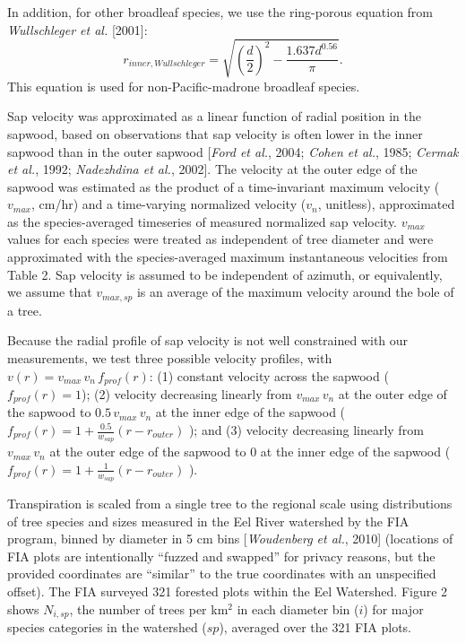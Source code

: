In addition, for other broadleaf species, we use the ring-porous equation from \textit{Wullschleger et al.} [2001]:
\begin{equation}
r_{inner,Wullschleger} = \sqrt{\left(\frac{d}{2}\right)^2-\frac{1.637d^{0.56}}{\pi}}.
\end{equation}
This equation is used for non-Pacific-madrone broadleaf species.

Sap velocity was approximated as a linear function of radial position in the sapwood, based on observations that sap velocity is often lower in the inner sapwood than in the outer sapwood [\textit{Ford et al.}, 2004; \textit{Cohen et al.}, 1985; \textit{Cermak et al.}, 1992; \textit{Nadezhdina et al.}, 2002].  The velocity at the outer edge of the sapwood was estimated as the product of a time-invariant maximum velocity ($v_{max}$, cm/hr) and a time-varying normalized velocity ($v_n$, unitless), approximated as the species-averaged timeseries of measured normalized sap velocity.  $v_{max}$ values for each species were treated as independent of tree diameter and were approximated with the species-averaged maximum instantaneous velocities from Table 2.  Sap velocity is assumed to be independent of azimuth, or equivalently, we assume that $v_{max,sp}$ is an average of the maximum velocity around the bole of a tree.

Because the radial profile of sap velocity is not well constrained with our measurements, we test three possible velocity profiles, with $v(r) = v_{max} \, v_n \, f_{prof}(r)$: (1) constant velocity across the sapwood ($f_{prof}(r) = 1$); (2) velocity decreasing linearly from $v_{max} \, v_n$ at the outer edge of the sapwood to $0.5 \, v_{max} \, v_n$ at the inner edge of the sapwood ($f_{prof}(r) = 1+\tfrac{0.5}{w_{sap}}(r-r_{outer})$ ); and (3) velocity decreasing linearly from $v_{max} \, v_n$ at the outer edge of the sapwood to 0 at the inner edge of the sapwood ($f_{prof}(r) = 1+\tfrac{1}{w_{sap}}(r-r_{outer})$ ).

Transpiration is scaled from a single tree to the regional scale using distributions of tree species and sizes measured in the Eel River watershed by the FIA program, binned by diameter in 5 cm bins [\textit{Woudenberg et al.}, 2010] (locations of FIA plots are intentionally ``fuzzed and swapped'' for privacy reasons, but the provided coordinates are ``similar'' to the true coordinates with an unspecified offset).  The FIA surveyed 321 forested plots within the Eel Watershed.  Figure 2 shows $N_{i,sp}$, the number of trees per km$^2$ in each diameter bin ($i$) for major species categories in the watershed ($sp$), averaged over the 321 FIA plots.


